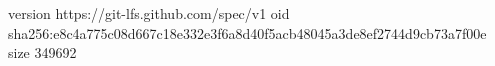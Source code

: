 version https://git-lfs.github.com/spec/v1
oid sha256:e8c4a775c08d667c18e332e3f6a8d40f5acb48045a3de8ef2744d9cb73a7f00e
size 349692
